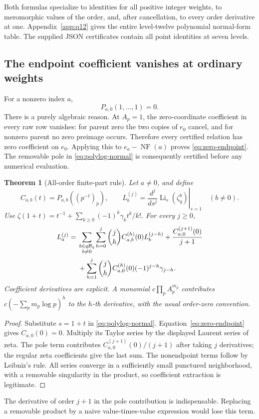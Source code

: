 \documentclass[11pt]{article}
\numberwithin{equation}{section}
\newtheorem{theorem}{Theorem}[section]
\theoremstyle{definition}
\theoremstyle{remark}
\DeclareMathOperator{\Li}{Li}
\DeclareMathOperator{\NF}{NF}
\newcommand{\B}{\mathcal B}
\begin{document}
Both formulas specialize to identities for all positive integer
weights, to meromorphic values of the order, and, after cancellation,
to every order derivative at one. Appendix~\ref{app:q12} gives the entire
level-twelve polynomial normal-form table. The supplied JSON
certificates contain all point identities at seven levels.

\subsection{The endpoint coefficient vanishes at ordinary weights}
For a nonzero index $a$,
\begin{equation}
 P_{a,0}(1,\ldots,1)=0.
 \label{eq:zero-endpoint}
\end{equation}
There is a purely algebraic reason. At $A_p=1$, the zero-coordinate
coefficient in every raw row vanishes: for parent zero the two copies
of $e_0$ cancel, and for nonzero parent no zero preimage occurs.
Therefore every certified relation has zero coefficient on $e_0$.
Applying this to $e_a-\NF(a)$ proves \eqref{eq:zero-endpoint}.
The removable pole in \eqref{eq:polylog-normal} is consequently
certified before any numerical evaluation.

\begin{theorem}[All-order finite-part rule]
\label{thm:finitepart}
Let $a\ne0$, and define
\[
 C_{a,b}(t)=P_{a,b}((p^{-t})_p),\qquad
 L_b^{(j)}=\left.\frac{d^j}{ds^j}\Li_s(\zeta_q^b)\right|_{s=1}
 \quad(b\ne0).
\]
Use $\zeta(1+t)=t^{-1}+\sum_{k\ge0}(-1)^k\gamma_k t^k/k!$.
For every $j\ge0$,
\begin{align}
 L_a^{(j)}={}&
 \sum_{\substack{b\in q\B_q\\b\ne0}}
 \sum_{h=0}^{j}\binom jh C_{a,b}^{(h)}(0)L_b^{(j-h)}
 +\frac{C_{a,0}^{(j+1)}(0)}{j+1}\notag\\
 &+\sum_{h=1}^{j}\binom jh C_{a,0}^{(h)}(0)
                         (-1)^{j-h}\gamma_{j-h}.
 \label{eq:finitepart}
\end{align}
Coefficient derivatives are explicit. A monomial
$c\prod_p A_p^{m_p}$ contributes
$c(-\sum_pm_p\log p)^h$ to the $h$-th derivative, with the usual
order-zero convention.
\end{theorem}
\begin{proof}
Substitute $s=1+t$ in \eqref{eq:polylog-normal}.
Equation~\eqref{eq:zero-endpoint} gives $C_{a,0}(0)=0$.
Multiply its Taylor series by the displayed Laurent series of zeta.
The pole term contributes $C_{a,0}^{(j+1)}(0)/(j+1)$ after taking
$j$ derivatives; the regular zeta coefficients give the last sum.
The nonendpoint terms follow by Leibniz's rule. All series converge
in a sufficiently small punctured neighborhood, with a removable
singularity in the product, so coefficient extraction is legitimate.
\end{proof}
The derivative of order $j+1$ in the pole contribution is indispensable.
Replacing a removable product by a naive value-times-value expression
would lose this term.
\end{document}
